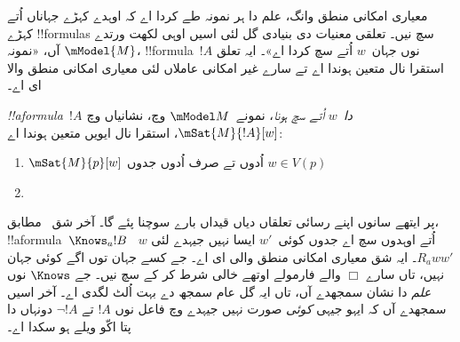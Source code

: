 \documentclass[../../../include/open-logic-section]{subfiles}
\begin{document}


معیاری امکانی منطق وانگ، علم دا ہر نمونہ طے کردا اے کہ اوہدے
کہڑے جہاناں اُتے کہڑے !!{formula}s سچ نیں۔ تعلقی معنیات دی بنیادی
گل لئی اسیں اوہی لکھت ورتدے آں، «نمونہ $\mModel{M}$، !!{formula}~$!A$
نوں جہان~$w$ اُتے سچ کردا اے»۔ ایہ تعلق استقرا نال متعین ہوندا اے تے
سارے غیر امکانی عاملاں لئی معیاری امکانی منطق والا ای اے۔

\begin{defn}
  \emph{!!a{formula}~$!A$ دا~$w$ اُتے سچ ہونا}، نمونے~$\mModel M$
  وچ، نشانیاں وچ $\mSat{M}{!A}[w]$، استقرا نال ایویں متعین ہوندا اے:
  \begin{enumerate}
  \item $\mSat{M}{p}[w]$ اُدوں تے صرف اُدوں جدوں $w \in V(p)$
  \item{}
  \end{enumerate}
\end{defn}

پر ایتھے سانوں اپنے رسائی تعلقاں دیاں قیداں بارے سوچنا پئے گا۔
آخر شق~ مطابق، !!a{formula}~$\Knows_a !B$
~$w$ اُتے اوہدوں سچ اے جدوں کوئی~$w'$ ایسا نہیں جیہدے لئی $R_a ww'$۔
ایہ شق معیاری امکانی منطق والی ای اے۔ جے کسے جہان توں اگے کوئی جہان
نہیں، تاں سارے $\Box$ والے فارمولے اوتھے خالی شرط کر کے سچ نیں۔
جے $\Knows$ نوں \emph{علم} دا نشان سمجھدے آں، تاں ایہ گل عام سمجھ
دے بہت اُلٹ لگدی اے۔ آخر اسیں سمجھدے آں کہ ایہو جیہی \emph{کوئی}
صورت نہیں جیہدے وچ فاعل نوں $!A$ تے $\lnot !A$ دونہاں دا پتا
اکّو ویلے ہو سکدا اے۔
\end{document}
